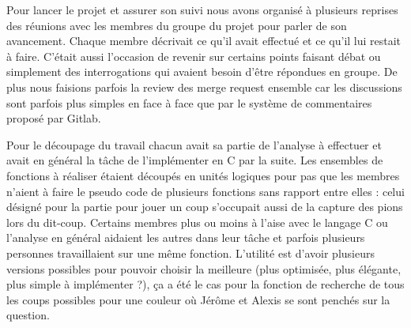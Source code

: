 \hspace{3em}
Pour lancer le projet et assurer son suivi nous avons organisé à plusieurs reprises des réunions avec les membres du groupe du projet pour parler de son avancement. Chaque membre décrivait ce qu’il avait effectué et ce qu’il lui restait à faire. C’était aussi l’occasion de revenir sur certains points faisant débat ou simplement des interrogations qui avaient besoin d’être répondues en groupe. De plus nous faisions parfois la review des merge request ensemble car les discussions sont parfois plus simples en face à face que par le système de commentaires proposé par Gitlab.

	Pour le découpage du travail chacun avait sa partie de l’analyse à effectuer et avait en général la tâche de l’implémenter en C par la suite. Les ensembles de fonctions à réaliser étaient découpés en unités logiques pour pas que les membres n’aient à faire le pseudo code de plusieurs fonctions sans rapport entre elles : celui désigné pour la partie pour jouer un coup s’occupait aussi de la capture des pions lors du dit-coup. Certains membres plus ou moins à l’aise avec le langage C ou l’analyse en général aidaient les autres dans leur tâche et parfois plusieurs personnes travaillaient sur une même fonction. L’utilité est d’avoir plusieurs versions possibles pour pouvoir choisir la meilleure (plus optimisée, plus élégante, plus simple à implémenter ?), ça a été le cas pour la fonction de recherche de tous les coups possibles pour une couleur où Jérôme et Alexis se sont penchés sur la question.

